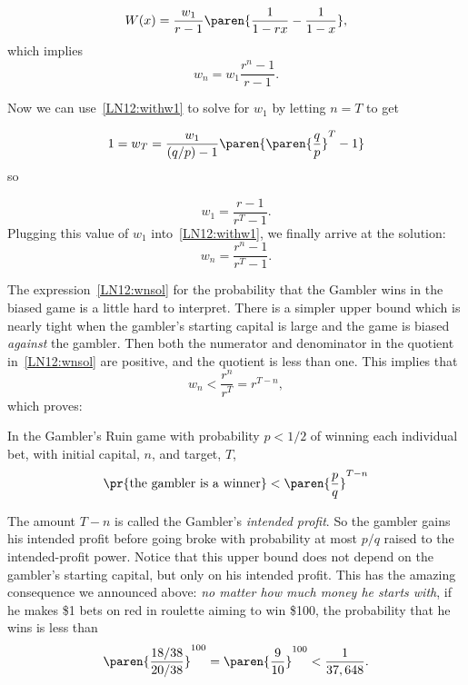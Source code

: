 \[
W(x) = \frac{w_1}{r-1} \paren{\frac{1}{1-rx} - \frac{1}{1-x}},
\]
which implies
\begin{equation}\label{LN12:withw1}
w_n = w_1\frac{r^n - 1}{r-1}.
\end{equation}

Now we can use~\eqref{LN12:withw1} to solve for $w_1$ by letting $n=T$ to get
\begin{editingnotes}

\[
1=w_T = \frac{w_1}{(q/p)-1}\paren{\paren{\frac{q}{p}}^T - 1}
\]
so
\end{editingnotes}

\[
w_1= \frac{r - 1}{r^T-1}.
\]
Plugging this value of $w_1$ into~\eqref{LN12:withw1}, we finally arrive at
the solution:
\begin{equation}\label{LN12:wnsol}
w_n = \frac{r^n-1}{r^T -1}. 
\end{equation}

The expression~\eqref{LN12:wnsol} for the probability that the Gambler wins
in the biased game is a little hard to interpret.  There is a simpler
upper bound which is nearly tight when the gambler's starting capital is
large and the game is biased {\em against} the
gambler.  Then both the numerator and denominator in the quotient
in~\eqref{LN12:wnsol} are positive, and the quotient is less than one.  This
implies that
\[
w_n < \frac{r^n}{r^T} = r^{T-n}, 
\]
which proves:
\begin{corollary}\label{LN12:biaswincor}
  In the Gambler's Ruin game with probability $p< 1/2$ of winning each
  individual bet, with initial capital, $n$, and target, $T$,
\begin{equation}\label{LN12:biaswinsimp}
\pr{\text{the gambler is a winner}} < \paren{\frac{p}{q}}^{T-n}
\end{equation}
\end{corollary}

The amount $T-n$ is called the Gambler's \emph{intended profit}.  So the
gambler gains his intended profit before going broke with probability at
most $p/q$ raised to the intended-profit power.  Notice that this upper
bound does not depend on the gambler's starting capital, but only on his
intended profit.  This has the amazing consequence we announced above:
\emph{no matter how much money he starts with}, if he
makes \$1 bets on red in roulette aiming to win \$100, the
probability that he wins is less than
\[
\paren{\frac{18/38}{20/38}}^{100} = \paren{\frac{9}{10}}^{100} < \frac{1}{37,648}.
\]

